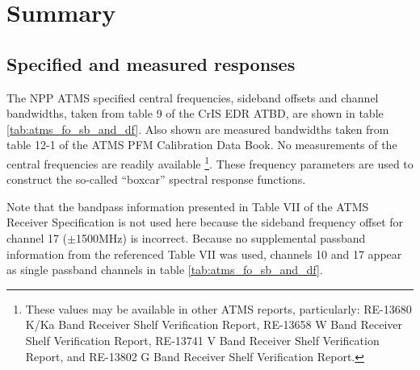 \section{Summary}
\subsection{Specified and measured responses}
The NPP ATMS specified central frequencies, sideband offsets and channel bandwidths, taken from table 9 of the CrIS EDR ATBD\cite{CrIS_EDR_ATBD}, are shown in table \ref{tab:atms_fo_sb_and_df}. Also shown 
are measured bandwidths taken from table 12-1 of the ATMS PFM Calibration Data Book\cite{ATMS_PFM_CalLog}. No measurements of the central frequencies are readily available \footnote{These values may be available in other ATMS reports, particularly: RE-13680 K/Ka Band Receiver Shelf Verification Report, RE-13658 W Band Receiver Shelf Verification Report, RE-13741 V Band Receiver Shelf Verification Report, and RE-13802 G Band Receiver Shelf Verification Report.}. These frequency parameters are used to construct the so-called ``boxcar'' spectral response functions. 

Note that the bandpass information presented in Table VII of the ATMS Receiver Specification\cite{ATMS_Receiver_Spec} is not used here because the sideband frequency offset for channel 17 ($\pm$1500MHz) is  incorrect. Because no supplemental passband information from the referenced Table VII\cite{ATMS_Receiver_Spec} was used, channels 10 and 17 appear as single passband channels in table \ref{tab:atms_fo_sb_and_df}.

